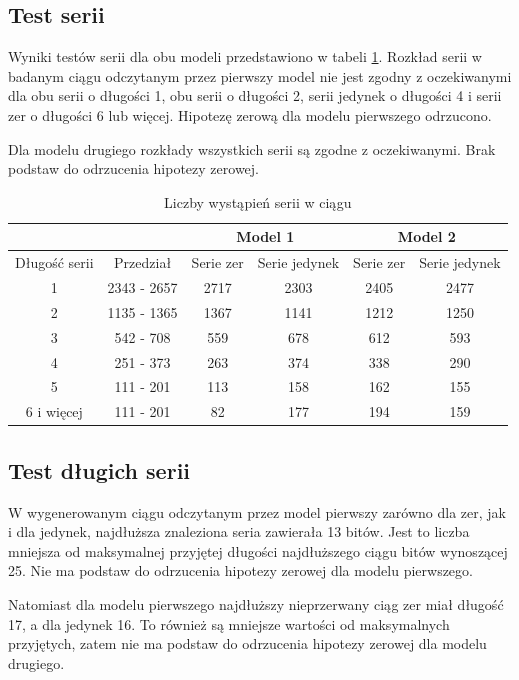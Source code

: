 \subsection{Test serii}

Wyniki testów serii dla obu modeli przedstawiono w tabeli \ref{serieTabela}. Rozkład serii w badanym ciągu odczytanym
przez pierwszy model nie jest zgodny z oczekiwanymi dla obu serii o długości 1, obu serii o długości 2, serii jedynek 
o długości 4 i serii zer o długości 6 lub więcej. Hipotezę zerową dla modelu pierwszego odrzucono.

Dla modelu drugiego rozkłady wszystkich serii są zgodne z oczekiwanymi. Brak podstaw do odrzucenia hipotezy zerowej.
\begin{table}[H]
    \centering
    \caption{Liczby wystąpień serii w ciągu}
    \label{serieTabela}
    \begin{tabular}{|c|c|c|c|c|c|} 
        \hline
        \multicolumn{2}{|c|}{} & \multicolumn{2}{c|}{Model 1} & \multicolumn{2}{c|}{Model 2} \\
        \hline
        Długość serii & Przedział & Serie zer & Serie jedynek & Serie zer & Serie jedynek \\
        \hline
        1 & 2343 - 2657 & 2717 & 2303 & 2405 & 2477 \\
        \hline
        2 & 1135 - 1365 & 1367 & 1141 & 1212 & 1250 \\
        \hline
        3 & 542 - 708 & 559 & 678 & 612 & 593 \\
        \hline
        4 & 251 - 373 & 263 & 374 & 338 & 290 \\
        \hline
        5 & 111 - 201 & 113 & 158 & 162 & 155 \\
        \hline
        6 i więcej & 111 - 201 & 82 & 177 & 194 & 159 \\
        \hline  
    \end{tabular} 
\end{table}   

\subsection{Test długich serii}
W wygenerowanym ciągu odczytanym przez model pierwszy zarówno dla zer, jak i dla jedynek, najdłuższa znaleziona seria 
zawierała 13 bitów. Jest to liczba mniejsza od maksymalnej przyjętej długości najdłuższego ciągu bitów wynoszącej 25. 
Nie ma podstaw do odrzucenia hipotezy zerowej dla modelu pierwszego. \par
Natomiast dla modelu pierwszego najdłuższy nieprzerwany ciąg zer miał długość 17, a dla jedynek 16. To również są 
mniejsze wartości od maksymalnych przyjętych, zatem nie ma podstaw do odrzucenia hipotezy zerowej dla modelu drugiego.

